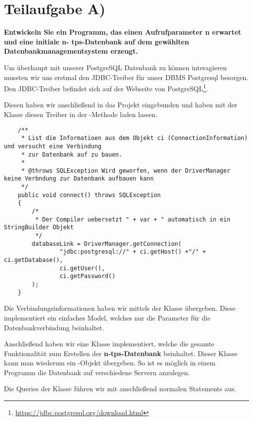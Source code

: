 \section{Teilaufgabe A)}
\textbf{Entwickeln Sie ein Programm, das einen Aufrufparameter n erwartet und eine initiale n-
tps-Datenbank auf dem gewählten Datenbankmanagementsystem erzeugt.}

Um überhaupt mit unserer PostgreSQL Datenbank zu können interagieren mussten wir
uns erstmal den JDBC-Treiber für unser DBMS Postgresql besorgen. Den
JDBC-Treiber befindet sich auf der Webseite von
PostgreSQL\footnote{\url{https://jdbc.postgresql.org/download.html}}.

Diesen haben wir anschließend in das Projekt eingebunden und haben mit der
Klasse  diesen Treiber in der
-Methode laden lassen.

\begin{lstlisting}
	/**
	 * List die Informatioen aus dem Objekt ci (ConnectionInformation) und versucht eine Verbindung 
	 * zur Datenbank auf zu bauen.
	 * 
	 * @throws SQLException Wird geworfen, wenn der DriverManager keine Verbndung zur Datenbank aufbauen kann
	 */
	public void connect() throws SQLException
	{
		/*
		 * Der Compiler uebersetzt " + var + " automatisch in ein StringBuilder Objekt
		 */
		databaseLink = DriverManager.getConnection(
				"jdbc:postgresql://" + ci.getHost() +"/" + ci.getDatabase(),
				ci.getUser(), 
				ci.getPassword()
		);
	}
\end{lstlisting}

Die Verbindungsinformationen haben wir mittels der Klasse
 übergeben. Diese implementiert ein einfaches Model, welches
nur die Parameter für die Datenbankverbindung beinhaltet.

Anschließend haben wir eine Klasse  implementiert, welche die
gesamte Funktionalität zum Erstellen der \textbf{n-tps-Datenbank} beinhaltet.
Dieser Klasse kann man wiederum ein -Objekt
übergeben. So ist es möglich in einem Programm die Datenbank auf
verschiedene Servern anzulegen. 

Die Queries der Klasse 
führen wir mit anschließend normalen Statements aus. 

